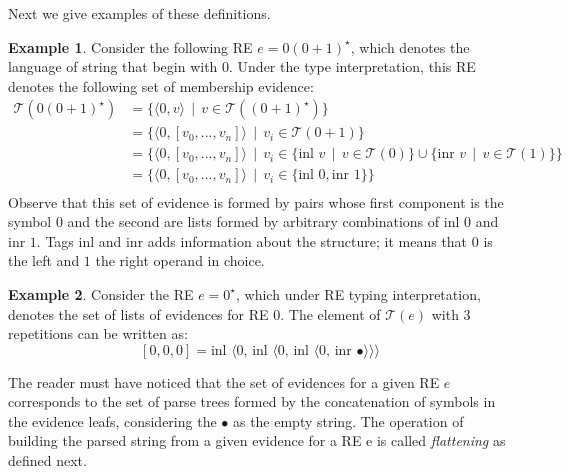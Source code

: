 \documentclass[oneside,12pt]{scrbook}
\theoremstyle{definition}
\newtheorem{Example}{Example}
\theoremstyle{plain}
\theoremstyle{definition}
\begin{document}
Next we give examples of these definitions.

\begin{Example}
   Consider the following RE $e = 0(0 + 1)^\star$, which denotes the language of string that begin with 0.
   Under the type interpretation, this RE denotes the following set of membership evidence:
   \begin{align*}
      \mathcal{T}(0(0+1)^\star) & = \{\langle 0 , v \rangle\, \mid\, v \in \mathcal{T}((0 + 1)^\star) \}\\
                                & = \{\langle 0 , [v_0,...,v_n] \rangle\, \mid\, v_i \in\mathcal{T}(0 + 1)\} \\
                                & = \{\langle 0 , [v_0,...,v_n] \rangle\, \mid\, v_i \in \{\text{inl }v\,\mid\,v \in \mathcal{T}(0)\} \cup
                                                                                           \{\text{inr }v\,\mid\,v \in \mathcal{T}(1)\}\} \\
                                & = \{\langle 0 , [v_0,...,v_n] \rangle\, \mid\, v_i \in \{\text{inl }0, \text{inr }1\}\} \\
   \end{align*}
   Observe that this set of evidence is formed by pairs whose first component is the symbol 0 and the second are
   lists formed by arbitrary combinations of $\text{inl }0$ and $\text{inr }1$. Tags inl and inr adds information
   about the structure; it means that $0$ is the left and $1$ the right operand in choice.
\end{Example}

\begin{Example}
   Consider the RE $e = 0^\star$, which under RE typing interpretation, denotes the set of lists of evidences for RE 0.
   The element of $\mathcal{T}(e)$ with 3 repetitions can be written as:
   \[
       [0,0,0] = \text{inl }\langle 0 ,\, \text{inl } \langle 0,\, \text{inl } \langle 0,\, \text{inr }\bullet \rangle \rangle \rangle
   \]
\end{Example}

The reader must have noticed that the set of evidences for a given RE $e$ corresponds to the set of parse trees formed by the
concatenation of symbols in the evidence leafs, considering the $\bullet$ as the empty string. The operation of building the
parsed string from a given evidence for a RE e is called \emph{flattening} as defined next.
\end{document}
